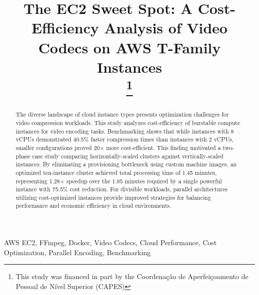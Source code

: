 \documentclass[conference]{IEEEtran}
\begin{document}
	
	\title{The EC2 Sweet Spot: A Cost-Efficiency Analysis of Video Codecs on AWS T-Family Instances\\
	\thanks{This study was financed in part by the Coordenação de Aperfeiçoamento de Pessoal de Nível Superior (CAPES)}
}
	
	\author{
		\and
	}
	
	\maketitle
	
	\begin{abstract}
		The diverse landscape of cloud instance types presents optimization challenges for video compression workloads. This study analyzes cost-efficiency of burstable compute instances for video encoding tasks. Benchmarking shows that while instances with 8 vCPUs demonstrated 40.5\% faster compression times than instances with 2 vCPUs, smaller configurations proved 20× more cost-efficient. This finding motivated a two-phase case study comparing horizontally-scaled clusters against vertically-scaled instances. By eliminating a provisioning bottleneck using custom machine images, an optimized ten-instance cluster achieved total processing time of 1.45 minutes, representing 1.28× speedup over the 1.85 minutes required by a single powerful instance with 75.5\% cost reduction. For divisible workloads, parallel architectures utilizing cost-optimized instances provide improved strategies for balancing performance and economic efficiency in cloud environments.
	\end{abstract}
	
	\begin{IEEEkeywords}
		AWS EC2, FFmpeg, Docker, Video Codecs, Cloud Performance, Cost Optimization, Parallel Encoding, Benchmarking
	\end{IEEEkeywords}
	
\end{document}
